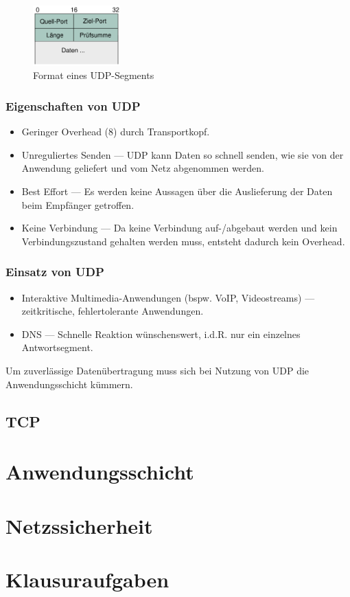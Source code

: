 \documentclass[a4paper, 14pt]{article}
\begin{document}
	\begin{figure}
		\begin{center}
			\includegraphics[width=0.3\textwidth]{images/06-udp-segment.png}
		\end{center}
		\caption{Format eines UDP-Segments}
	\end{figure}

	\subsubsection{Eigenschaften von UDP}

	\begin{itemize}
		\item Geringer Overhead (\SI{8}{\byte}) durch Transportkopf.
		\item Unreguliertes Senden --- UDP kann Daten so schnell senden, wie sie von der Anwendung geliefert und vom Netz abgenommen werden.
		\item Best Effort --- Es werden keine Aussagen über die Auslieferung der Daten beim Empfänger getroffen.
		\item Keine Verbindung --- Da keine Verbindung auf-/abgebaut werden und kein Verbindungszustand gehalten werden muss, entsteht dadurch kein Overhead.
	\end{itemize}

	\subsubsection{Einsatz von UDP}

	\begin{itemize}
		\item Interaktive Multimedia-Anwendungen (bspw. VoIP, Videostreams) --- zeitkritische, fehlertolerante Anwendungen.
		\item DNS --- Schnelle Reaktion wünschenswert, i.d.R. nur ein einzelnes Antwortsegment.
	\end{itemize}

	Um zuverlässige Datenübertragung muss sich bei Nutzung von UDP die Anwendungsschicht kümmern.


	\subsection{TCP}

	\section{Anwendungsschicht}

	\section{Netzssicherheit}

	\section{Klausuraufgaben}
\end{document}
